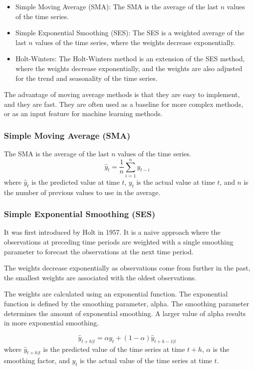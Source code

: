 \documentclass[manuscript,screen,nonacm]{acmart}
\numberwithin{equation}{section}
\begin{document}
\begin{itemize}
\item Simple Moving Average (SMA): The SMA is the average of the last $n$ values of the time series.
\item Simple Exponential Smoothing (SES): The SES is a weighted average of  the last $n$ values of the time series, where the weights decrease exponentially.
\item Holt-Winters: The Holt-Winters method is an extension of the SES method, where the weights decrease exponentially, and the weights are also adjusted for the trend and seasonality of the time series.
\end{itemize}

The advantage of moving average methods is that they are easy to implement, and they are fast. 
They are often used as a baseline for more complex methods, or as an input feature for machine learning methods.

\subsubsection{Simple Moving Average (SMA)}
The SMA is the average of the last $n$ values of the time series.
\begin{equation}
\label{eq:sma}
\hat{y}_{t} = \frac{1}{n} \sum_{i=1}^{n} y_{t-i}
\end{equation}
where $\hat{y}_{t}$ is the predicted value at time $t$, $y_{t}$ is the actual value at time $t$, and $n$ is the number of previous values to use in the average.


\subsubsection{Simple Exponential Smoothing (SES)}
It was first introduced by Holt in 1957. It is a naive approach where the observations at
preceding time periods are weighted with a single smoothing parameter to forecast the
observations at the next time period.

The weights decrease exponentially as observations come from further in the past,
the smallest weights are associated with the oldest observations.

The weights are calculated using an exponential function. The exponential function is defined by
the smoothing parameter, alpha. The smoothing parameter determines the amount of exponential
smoothing. A larger value of alpha results in more exponential smoothing.

\begin{equation}
\label{eq:ses}
\hat{y}_{t+h|t} = \alpha y_t + (1-\alpha)\hat{y}_{t+h-1|t}
\end{equation}
where $\hat{y}_{t+h|t}$ is the predicted value of the time series at time $t+h$,
$\alpha$ is the smoothing factor, and $y_t$ is the actual value of the time series
at time $t$.
\end{document}
